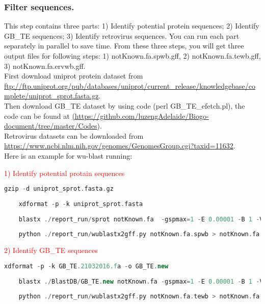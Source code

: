 \documentclass[a4paper,12pt]{article}
\begin{document}
	\pagebreak
	
	\subsubsection{Filter sequences.}
	This step contains three parts: 1) Identify potential protein sequences; 2) Identify GB\_TE sequences; 3) Identify retrovirus sequences. You can run each part separately in parallel to save time. From these three steps, you will get three output files for following steps: 1) notKnown.fa.spwb.gff, 2) notKnown.fa.tewb.gff, 3) notKnown.fa.ervwb.gff. \\
	
	\noindent First download uniprot protein dataset from \url{ftp://ftp.uniprot.org/pub/databases/uniprot/current_release/knowledgebase/complete/uniprot_sprot.fasta.gz}. \\
	
	\noindent Then download GB\_TE dataset by using code (perl GB\_TE\_efetch.pl), the code can be found at \href{<url>}(\url{https://github.com/luzengAdelaide/Biogo-document/tree/master/Codes}). \\
	
	\noindent Retrovirus datasets can be downloaded from \url{https://www.ncbi.nlm.nih.gov/genomes/GenomesGroup.cgi?taxid=11632}.\\
	
	\noindent Here is an example for wu-blast running:
	
	\noindent \textcolor{red}{1) Identify potential protain sequences}
	\begin{lstlisting}[language=scala]
	gzip -d uniprot_sprot.fasta.gz
	
	xdformat -p -k uniprot_sprot.fasta
	
	blastx ./report_run/sprot notKnown.fa  -gspmax=1 -E 0.00001 -B 1 -V 1 -cpus=32 > notKnown.fa.spwb
	
	python ./report_run/wublastx2gff.py notKnown.fa.spwb > notKnown.fa.spwb.gff \end{lstlisting}
	
	\noindent \textcolor{red}{2) Identify GB\_TE sequences}
	\begin{lstlisting}[language=scala]
	xdformat -p -k GB_TE.21032016.fa -o GB_TE.new
	
	blastx ./BlastDB/GB_TE.new notKnown.fa -gspmax=1 -E 0.00001 -B 1 -V 1 -cpus=32 > notKnown.fa.tewb
	
	python ./report_run/wublastx2gff.py notKnown.fa.tewb > notKnown.fa.tewb.gff \end{lstlisting}
	
\end{document}
